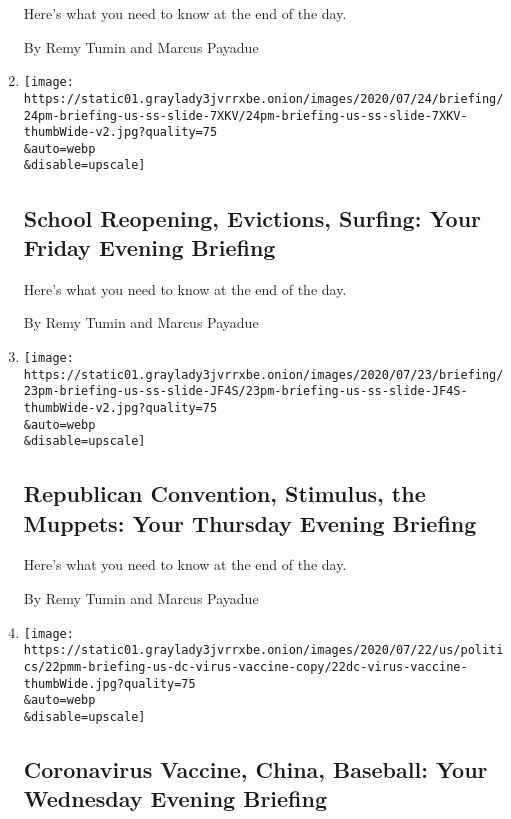 \begin{enumerate}
  Here's what you need to know at the end of the day.

  By Remy Tumin and Marcus Payadue
\item
  \href{/2020/07/24/briefing/school-reopening-evictions-surfing.html}{}

  \texttt{[image: https://static01.graylady3jvrrxbe.onion/images/2020/07/24/briefing/24pm-briefing-us-ss-slide-7XKV/24pm-briefing-us-ss-slide-7XKV-thumbWide-v2.jpg?quality=75\\\&auto=webp\\\&disable=upscale]}

  \hypertarget{school-reopening-evictions-surfing-your-friday-evening-briefing}{%
  \subsection{School Reopening, Evictions, Surfing: Your Friday Evening
  Briefing}\label{school-reopening-evictions-surfing-your-friday-evening-briefing}}

  Here's what you need to know at the end of the day.

  By Remy Tumin and Marcus Payadue
\item
  \href{/2020/07/23/briefing/republican-convention-stimulus-the-muppets.html}{}

  \texttt{[image: https://static01.graylady3jvrrxbe.onion/images/2020/07/23/briefing/23pm-briefing-us-ss-slide-JF4S/23pm-briefing-us-ss-slide-JF4S-thumbWide-v2.jpg?quality=75\\\&auto=webp\\\&disable=upscale]}

  \hypertarget{republican-convention-stimulus-the-muppets-your-thursday-evening-briefing}{%
  \subsection{Republican Convention, Stimulus, the Muppets: Your
  Thursday Evening
  Briefing}\label{republican-convention-stimulus-the-muppets-your-thursday-evening-briefing}}

  Here's what you need to know at the end of the day.

  By Remy Tumin and Marcus Payadue
\item
  \href{/2020/07/22/briefing/vaccine-china-baseball-.html}{}

  \texttt{[image: https://static01.graylady3jvrrxbe.onion/images/2020/07/22/us/politics/22pmm-briefing-us-dc-virus-vaccine-copy/22dc-virus-vaccine-thumbWide.jpg?quality=75\\\&auto=webp\\\&disable=upscale]}

  \hypertarget{coronavirus-vaccine-china-baseball-your-wednesday-evening-briefing}{%
  \subsection{Coronavirus Vaccine, China, Baseball: Your Wednesday
  Evening
  Briefing}\label{coronavirus-vaccine-china-baseball-your-wednesday-evening-briefing}}


\end{enumerate}
